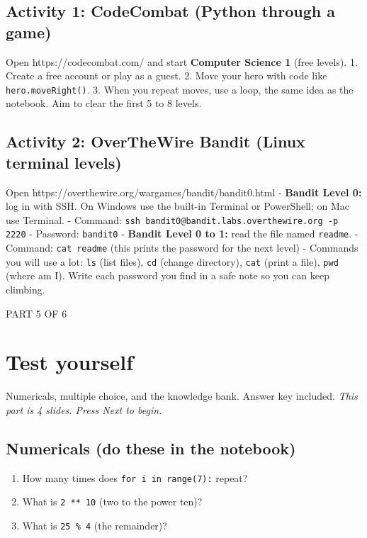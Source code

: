 \documentclass[12pt,openany]{book}
\begin{document}
\medskip

\subsection*{Activity 1: CodeCombat (Python through a game)}


Open https://codecombat.com/ and start \textbf{Computer Science 1} (free levels).
1. Create a free account or play as a guest.
2. Move your hero with code like \texttt{hero.moveRight()}.
3. When you repeat moves, use a loop, the same idea as the notebook.
Aim to clear the first 5 to 8 levels.

\medskip

\subsection*{Activity 2: OverTheWire Bandit (Linux terminal levels)}


Open https://overthewire.org/wargames/bandit/bandit0.html
- \textbf{Bandit Level 0:} log in with SSH. On Windows use the built-in Terminal or PowerShell; on Mac use Terminal.
  - Command: \texttt{ssh bandit0@bandit.labs.overthewire.org -p 2220}
  - Password: \texttt{bandit0}
- \textbf{Bandit Level 0 to 1:} read the file named \texttt{readme}.
  - Command: \texttt{cat readme}  (this prints the password for the next level)
- Commands you will use a lot: \texttt{ls} (list files), \texttt{cd} (change directory), \texttt{cat} (print a file), \texttt{pwd} (where am I).
Write each password you find in a safe note so you can keep climbing.

\medskip

\vspace{4pt}\noindent\textsc{PART 5 OF 6}


\section*{Test yourself}

Numericals, multiple choice, and the knowledge bank. Answer key included.
{\small\itshape\color{gray}This part is 4 slides. Press Next to begin.}

\medskip

\subsection*{Numericals (do these in the notebook)}


\begin{enumerate}

  \item How many times does \texttt{for i in range(7):} repeat?

  \item What is \texttt{2 ** 10} (two to the power ten)?

  \item What is \texttt{25 \% 4} (the remainder)?

\end{enumerate}
\end{document}
